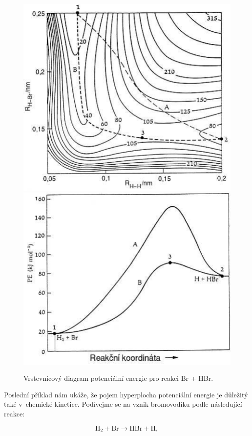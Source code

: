 \begin{figure} [ht]
\centering
\begin{center}\includegraphics[scale=1.0]{obrazky/potsurface1.pdf}\hfill\raise 2mm\hbox{\includegraphics[scale=1.0]{obrazky/potsurface2.pdf}}
\end{center}
\caption{Vrstevnicový diagram potenciální energie pro reakci Br + HBr.}
\label{obr:mol:HBr}
\end{figure}

Poslední příklad nám ukáže, že pojem hyperplocha potenciální energie je důležitý také v~chemické kinetice. Podívejme se na vznik bromovodíku podle následující reakce:

\begin{equation}
\mathrm{H}_2+\mathrm{Br}\longrightarrow\mathrm{HBr}+\mathrm{H}, 
\end{equation} 

